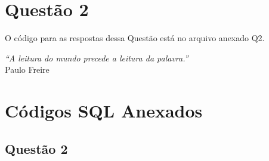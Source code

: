 \documentclass[a4paper,12pt]{article}
\begin{document}
\vspace{1cm}

\section{ Questão 2}

O código para as respostas dessa Questão está no arquivo anexado Q2.
\vspace{1cm}

\begin{flushright}
\textit{“A leitura do mundo precede a leitura da palavra.”}\\
Paulo Freire
\end{flushright}

\newpage
\section*{Códigos SQL Anexados}
\subsection{Questão 2}

\end{document}
